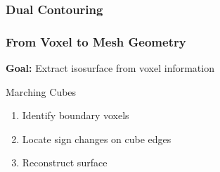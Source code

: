 
\subsubsection{Dual Contouring}

\begin{frame}
\frametitle{From Voxel to Mesh Geometry}
\vspace{-0.3cm}
\begin{center}
	\textbf{Goal:} Extract isosurface from voxel information	
\end{center}
\vspace{-0.5cm}	
\begin{minipage}[t]{0.4\linewidth}
	\begin{block}{Marching Cubes}
		\begin{enumerate}
			\item<2-> Identify boundary voxels
			\item<3-> Locate sign changes on cube edges
			\item<4-> Reconstruct surface
		\end{enumerate}
	\end{block}
\end{minipage}
\end{frame}
